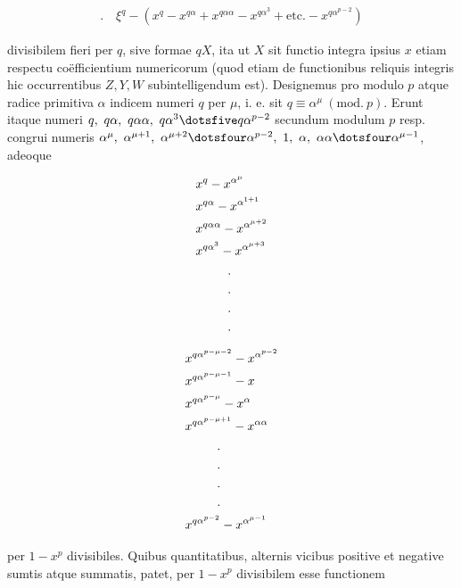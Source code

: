 \[
\begin{aligned}
\mathord{.}\quad\xi^q-(x^q-x^{q\alpha}+x^{q\alpha\alpha}-x^{q\alpha^3}+\text{etc.}-x^{q\alpha^{p-2}})
\end{aligned}
\]

divisibilem fieri per $q$, sive formae $qX$, ita ut $X$ sit functio integra ipsius $x$ etiam respectu coëfficientium numericorum (quod etiam de functionibus reliquis integris hic occurrentibus $Z,Y,W$ subintelligendum est). Designemus pro modulo $p$ atque radice primitiva $\alpha$ indicem numeri $q$ per $\mu$, i. e. sit $q\equiv\alpha^\mu\ (\mathrm{mod.}\ p)$. Erunt itaque numeri $q,\ q\alpha,\ q\alpha\alpha,\ q\alpha^3\dotsfive q\alpha^{p-2}$ secundum modulum $p$ resp. congrui numeris $\alpha^\mu,\allowbreak\ \alpha^{\mu+1},\allowbreak\ \alpha^{\mu+2}\dotsfour\alpha^{p-2},\allowbreak\ 1,\allowbreak\ \alpha,\allowbreak\ \alpha\alpha\dotsfour\alpha^{\mu-1}$, adeoque

\[
\begin{aligned}
&x^q-x^{\alpha^\mu}\\
&x^{q\alpha}-x^{\alpha^{1+1}}\\
&x^{q\alpha\alpha}-x^{\alpha^{\mu+2}}\\
&x^{q\alpha^3}-x^{\alpha^{\mu+3}}\\
&\hspace{9mm}\begin{gathered}.\\.\\.\\.\end{gathered}
\end{aligned}
\]

%
\[
\begin{aligned}
&x^{q\alpha^{p-\mu-2}}-x^{\alpha^{p-2}}\\
&x^{q\alpha^{p-\mu-1}}-x\\
&x^{q\alpha^{p-\mu}}-x^\alpha\\
&x^{q\alpha^{p-\mu+1}}-x^{\alpha\alpha}\\
&\hspace{9mm}\begin{gathered}.\\.\\.\\.\end{gathered}\\
&x^{q\alpha^{p-2}}-x^{\alpha^{\mu-1}}
\end{aligned}
\]

per $1-x^p$ divisibiles. Quibus quantitatibus, alternis vicibus positive et negative sumtis atque summatis, patet, per $1-x^p$ divisibilem esse functionem

